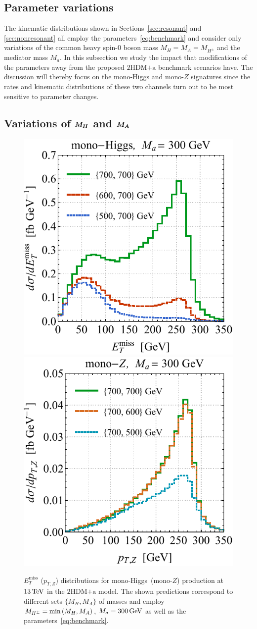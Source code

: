 \documentclass[a4paper, 11pt,notoc]{article}
\newcommand{\MET}{\ensuremath{E_T^\mathrm{miss}}\xspace}
\newcommand{\mA}{\ensuremath{M_{A}}\xspace}
\newcommand{\ma}{\ensuremath{M_{a}}\xspace}
\newcommand{\mH}{\ensuremath{M_{H}}\xspace}
\newcommand{\mHc}{\ensuremath{M_{H^{\pm}}}\xspace}
\newcommand{\hdma}{\ensuremath{\textrm{2HDM+a}}\xspace}
\def\bm#1{\mbox{\boldmath$#1$\unboldmath}}
\begin{document}
\subsection{Parameter variations}

The  kinematic distributions shown in Sections~\ref{sec:resonant} and \ref{sec:nonresonant}  all employ the parameters~\eqref{eq:benchmark} and consider only variations of the common heavy  spin-0 boson  mass $\mH = \mA = \mHc$ and the mediator mass $\ma$.  In this subsection we study the impact that modifications of the parameters away from the proposed \hdma benchmark scenarios have. The  discussion will thereby focus on the mono-Higgs and mono-$Z$ signatures since the rates and kinematic distributions of these two channels turn out to be  most sensitive to parameter changes. 

\subsection*{Variations of $\bm{\mH}$ and $\bm{\mA}$}

\begin{figure}[t!]
\centering
\includegraphics[height=0.45\textwidth]{mvarl.pdf} \qquad 
\includegraphics[height=0.45\textwidth]{mvarr.pdf}
\vspace{2mm}
\caption{\label{fig:mvar} $\MET$ ($p_{T,Z}$) distributions for mono-Higgs~(mono-$Z$) production at $13 \, {\rm TeV}$ in the \hdma model.  The shown predictions  correspond to different sets $\{M_{H}, M_A\}$ of masses and employ $\mHc = {\rm min} \left ( \mH, \mA \right )$, $M_a = 300 \, {\rm GeV}$  as well as the parameters~\eqref{eq:benchmark}.}
\end{figure}
\end{document}
